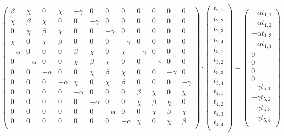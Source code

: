 \documentclass[12pt]{article}
\newcommand{\Gpmatrix}[1]{\ensuremath{\begin{pmatrix} #1 \end{pmatrix}}}
\newcommand{\sub}[3]{\ensuremath{#1_{#2,#3}}}
\begin{document}
\(
\Gpmatrix{
  \beta & \chi & 0 & \chi & -\gamma & 0 & 0 & 0 & 0 & 0 & 0 & 0 \\
  \chi & \beta & \chi & 0 & 0 & -\gamma & 0 & 0 & 0 & 0 & 0 & 0 \\
  0 & \chi & \beta & \chi & 0 & 0 & -\gamma & 0 & 0 & 0 & 0 & 0 \\
  \chi & 0 & \chi & \beta & 0 & 0 & 0 & -\gamma & 0 & 0 & 0 & 0 \\
  -\alpha & 0 & 0 & 0 & \beta & \chi & 0 & \chi & -\gamma & 0 & 0 & 0 \\
  0 & -\alpha & 0 & 0 & \chi & \beta & \chi & 0 & 0 & -\gamma & 0 & 0 \\
  0 & 0 & -\alpha & 0 & 0 & \chi & \beta & \chi & 0 & 0 & -\gamma & 0 \\
  0 & 0 & 0 & -\alpha & \chi & 0 & \chi & \beta & 0 & 0 & 0 & -\gamma \\
  0 & 0 & 0 & 0 & -\alpha & 0 & 0 & 0 & \beta & \chi & 0 & \chi \\
  0 & 0 & 0 & 0 & 0 & -\alpha & 0 & 0 & \chi & \beta & \chi & 0 \\
  0 & 0 & 0 & 0 & 0 & 0 & -\alpha & 0 & 0 & \chi & \beta & \chi \\
  0 & 0 & 0 & 0 & 0 & 0 & 0 & -\alpha & \chi & 0 & \chi & \beta \\
} \cdot \Gpmatrix{
  \sub{t}{2}{1} \\
  \sub{t}{2}{2} \\
  \sub{t}{2}{3} \\
  \sub{t}{2}{4} \\
  \sub{t}{3}{1} \\
  \sub{t}{3}{2} \\
  \sub{t}{3}{3} \\
  \sub{t}{3}{4} \\
  \sub{t}{4}{1} \\
  \sub{t}{4}{2} \\
  \sub{t}{4}{3} \\
  \sub{t}{4}{4} \\
} = \Gpmatrix{
  -\alpha\sub{t}{1}{1} \\
  -\alpha\sub{t}{1}{2} \\
  -\alpha\sub{t}{1}{3} \\
  -\alpha\sub{t}{1}{4} \\
  0 \\
  0 \\
  0 \\
  0 \\
  -\gamma\sub{t}{5}{1} \\
  -\gamma\sub{t}{5}{2} \\
  -\gamma\sub{t}{5}{3} \\
  -\gamma\sub{t}{5}{4} \\
}
\)
\end{document}
